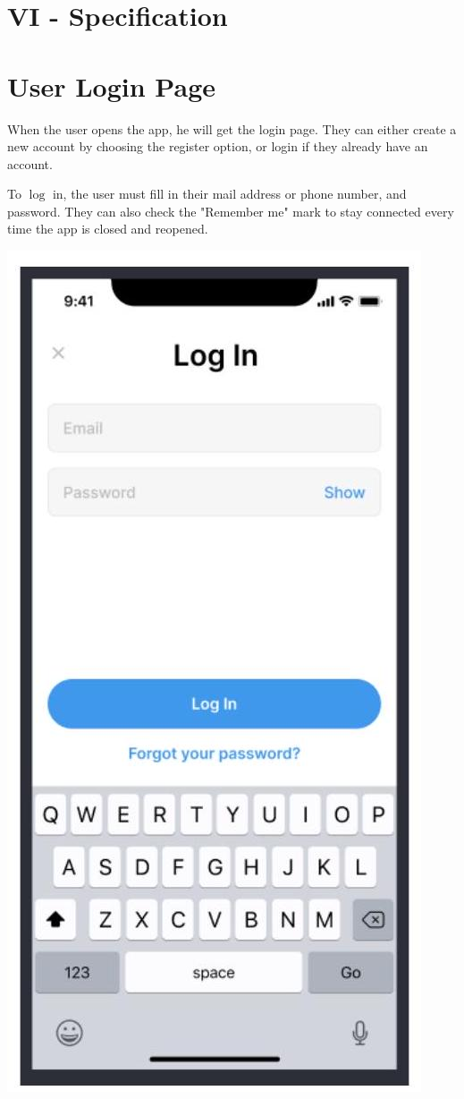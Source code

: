 \documentclass[10pt]{article}
\begin{document}
\section{VI - Specification}
\section{User Login Page}
When the user opens the app, he will get the login page. They can either create a new account by choosing the register option, or login if they already have an account.

To $\log$ in, the user must fill in their mail address or phone number, and password. They can also check the "Remember me" mark to stay connected every time the app is closed and reopened.

\includegraphics[max width=\textwidth]{2022_11_16_e80008f3d60227bff292g-4}
\end{document}
